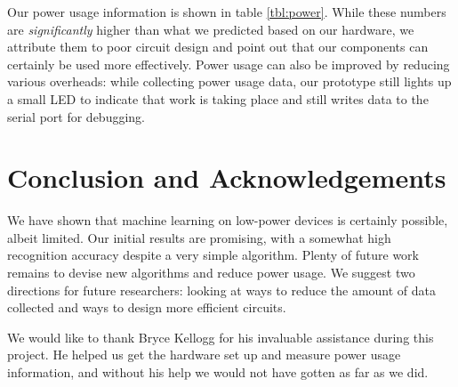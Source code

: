 \documentclass[12pt]{article}
\begin{document}
Our power usage information is shown in table \ref{tbl:power}. While these
numbers are \emph{significantly} higher than what we predicted based on our
hardware, we attribute them to poor circuit design and point out that our
components can certainly be used more effectively. Power usage can also be
improved by reducing various overheads: while collecting power usage data,
our prototype still lights up a small LED to indicate that work is taking place
and still writes data to the serial port for debugging.

\section{Conclusion and Acknowledgements}
We have shown that machine learning on low-power devices is certainly possible,
albeit limited. Our initial results are promising, with a somewhat high
recognition accuracy despite a very simple algorithm. Plenty of future work
remains to devise new algorithms and reduce power usage. We suggest two
directions for future researchers: looking at ways to reduce the amount of
data collected and ways to design more efficient circuits.

We would like to thank Bryce Kellogg for his invaluable assistance during this
project. He helped us get the hardware set up and measure power usage
information, and without his help we would not have gotten as far as we did.



\end{document}
